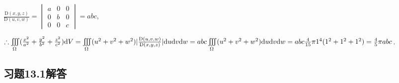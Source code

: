 \documentclass[12pt,UTF8]{ctexart}
\newcommand{\IIInt}[3]{\iiint\limits_{#1}#2\mathrm d#3}
\newcommand{\varIIInt}[5]{\iiint\limits_{#1}#2\mathrm d#3\mathrm d#4\mathrm d#5}
\begin{document}
\begin{enumerate}
$\frac{\mathrm D(x,y,z)}{\mathrm D(u,v,w)}=\begin{vmatrix}
a&0&0\\
0&b&0\\
0&0&c
\end{vmatrix}=abc$,

$\therefore\IIInt\Omega{(\frac{x^2}{a^2}+\frac{y^2}{b^2}+\frac{z^2}{c^2})}V=\varIIInt\Omega{(u^2+v^2+w^2)|\frac{\mathrm D(u,v,w)}{\mathrm D(x,y,z)}|}uvw=abc\varIIInt\Omega{(u^2+v^2+w^2)}uvw\\
=abc\frac4{15}\pi 1^4(1^2+1^2+1^2)=\frac45\pi abc$.

\end{enumerate}
\subsection{习题13.1解答}
\end{document}
